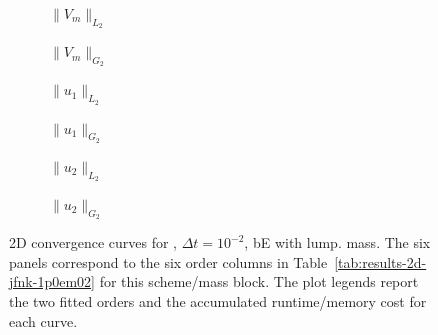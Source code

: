 \begin{figure}[p]
\centering
\begin{subfigure}{0.485\linewidth}
\centering
{}
\caption{$\|V_m\|_{L_2}$}
\label{fig:results-2d-jfnk-1p0em02-backwardeuler-lumped-a}
\end{subfigure}
\hfill
\begin{subfigure}{0.485\linewidth}
\centering
{}
\caption{$\|V_m\|_{G_2}$}
\label{fig:results-2d-jfnk-1p0em02-backwardeuler-lumped-b}
\end{subfigure}
\par\vspace{0.8em}
\begin{subfigure}{0.485\linewidth}
\centering
{}
\caption{$\|u_1\|_{L_2}$}
\label{fig:results-2d-jfnk-1p0em02-backwardeuler-lumped-c}
\end{subfigure}
\hfill
\begin{subfigure}{0.485\linewidth}
\centering
{}
\caption{$\|u_1\|_{G_2}$}
\label{fig:results-2d-jfnk-1p0em02-backwardeuler-lumped-d}
\end{subfigure}
\par\vspace{0.8em}
\begin{subfigure}{0.485\linewidth}
\centering
{}
\caption{$\|u_2\|_{L_2}$}
\label{fig:results-2d-jfnk-1p0em02-backwardeuler-lumped-e}
\end{subfigure}
\hfill
\begin{subfigure}{0.485\linewidth}
\centering
{}
\caption{$\|u_2\|_{G_2}$}
\label{fig:results-2d-jfnk-1p0em02-backwardeuler-lumped-f}
\end{subfigure}
\caption{2D convergence curves for , $\Delta t=10^{-2}$, bE with lump. mass. The six panels correspond to the six order columns in Table~\ref{tab:results-2d-jfnk-1p0em02} for this scheme/mass block. The plot legends report the two fitted orders and the accumulated runtime/memory cost for each curve.}
\label{fig:results-2d-jfnk-1p0em02-backwardeuler-lumped}
\end{figure}
\FloatBarrier

